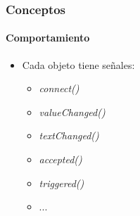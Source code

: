 \frame
{
\frametitle{Conceptos}
\framesubtitle{Comportamiento}
\begin{itemize}
	\item Cada objeto tiene  señales:
	\begin{itemize}
		\item \emph{connect()}
		\item \emph{valueChanged()}
		\item \emph{textChanged()}
		\item \emph{accepted()}
		\item \emph{triggered()}
		\item ...
	\end{itemize}
\end{itemize}
}
